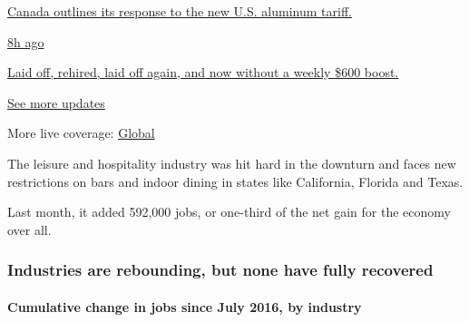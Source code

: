 \href{https://www.nytimes3xbfgragh.onion/live/2020/08/07/business/stock-market-today-coronavirus?action=click\&pgtype=Article\&state=default\&region=MAIN_CONTENT_1\&context=storylines_live_updates\#canada-outlines-its-response-to-the-new-us-aluminum-tariff}{Canada
outlines its response to the new U.S. aluminum tariff.}

\href{https://www.nytimes3xbfgragh.onion/live/2020/08/07/business/stock-market-today-coronavirus?action=click\&pgtype=Article\&state=default\&region=MAIN_CONTENT_1\&context=storylines_live_updates\#laid-off-rehired-laid-off-again-and-now-without-a-weekly-600-boost}{8h
ago}

\href{https://www.nytimes3xbfgragh.onion/live/2020/08/07/business/stock-market-today-coronavirus?action=click\&pgtype=Article\&state=default\&region=MAIN_CONTENT_1\&context=storylines_live_updates\#laid-off-rehired-laid-off-again-and-now-without-a-weekly-600-boost}{Laid
off, rehired, laid off again, and now without a weekly \$600 boost.}

\href{https://www.nytimes3xbfgragh.onion/live/2020/08/07/business/stock-market-today-coronavirus?action=click\&pgtype=Article\&state=default\&region=MAIN_CONTENT_1\&context=storylines_live_updates}{See
more updates}

More live coverage:
\href{https://www.nytimes3xbfgragh.onion/2020/08/07/world/covid-19-news.html?action=click\&pgtype=Article\&state=default\&region=MAIN_CONTENT_1\&context=storylines_live_updates}{Global}

The leisure and hospitality industry was hit hard in the downturn and
faces new restrictions on bars and indoor dining in states like
California, Florida and Texas.

Last month, it added 592,000 jobs, or one-third of the net gain for the
economy over all.

\hypertarget{industries-are-rebounding-but-none-have-fully-recovered}{%
\subsubsection{Industries are rebounding, but none have fully
recovered}\label{industries-are-rebounding-but-none-have-fully-recovered}}

\hypertarget{cumulative-change-in-jobs-since-july-2016-by-industry}{%
\paragraph{Cumulative change in jobs since July 2016, by
industry}\label{cumulative-change-in-jobs-since-july-2016-by-industry}}

